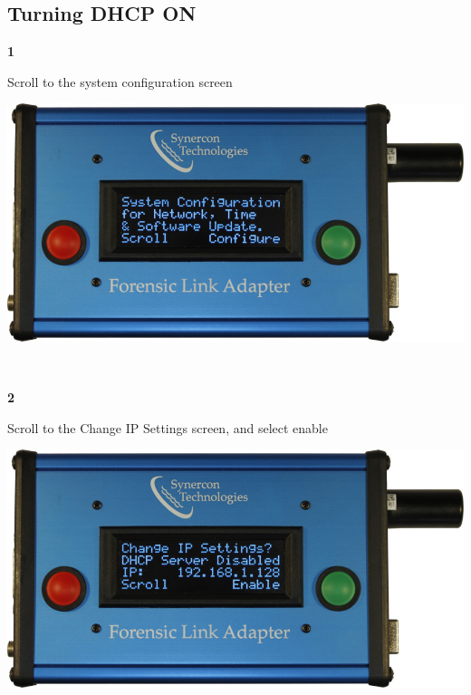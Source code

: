 \documentclass[11pt, oneside]{book}
\begin{document}
\subsection{Turning DHCP ON}
\noindent\begin{minipage}{0.45\textwidth}%
\begin{center}
\textbf{1}\\[\baselineskip]
\end{center}
Scroll to the system configuration screen
\end{minipage}%
\hfill%
\begin{minipage}{0.45\textwidth}
\includegraphics[width=\linewidth]{../media/fla_screens/ethernet_and_others/main/sys_conf}
\end{minipage}
\\[\baselineskip]
\noindent\begin{minipage}{0.45\textwidth}%
\begin{center}
\textbf{2}\\[\baselineskip]
\end{center}
Scroll to the Change IP Settings screen, and select enable
\end{minipage}%
\hfill%
\begin{minipage}{0.45\textwidth}
\includegraphics[width=\linewidth]{../media/fla_screens/ethernet_and_others/sys_conf/dhcp_dissabled}
\end{minipage}
\end{document}
